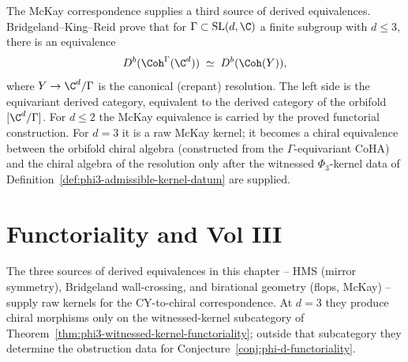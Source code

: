 \begin{remark}
\label{rem:mckay-derived}
The McKay correspondence supplies a third source of derived equivalences. Bridgeland--King--Reid \cite{BridgelandKingReid2001} prove that for $\Gamma \subset \mathrm{SL}(d, \C)$ a finite subgroup with $d \leq 3$, there is an equivalence
\[
 D^b(\Coh^\Gamma(\C^d)) \;\simeq\; D^b(\Coh(Y)),
\]
where $Y \to \C^d/\Gamma$ is the canonical (crepant) resolution. The left side is the equivariant derived category, equivalent to the derived category of the orbifold $[\C^d/\Gamma]$. For $d \leq 2$ the McKay equivalence is carried by the proved functorial construction. For $d = 3$ it is a raw McKay kernel; it becomes a chiral equivalence between the orbifold chiral algebra (constructed from the $\Gamma$-equivariant CoHA) and the chiral algebra of the resolution only after the witnessed $\Phi_3$-kernel data of Definition~\ref{def:phi3-admissible-kernel-datum} are supplied.
\end{remark}

\section{Functoriality and Vol III}
\label{sec:vol3-functoriality}

The three sources of derived equivalences in this chapter -- HMS (mirror symmetry), Bridgeland wall-crossing, and birational geometry (flops, McKay) -- supply raw kernels for the CY-to-chiral correspondence. At $d = 3$ they produce chiral morphisms only on the witnessed-kernel subcategory of Theorem~\ref{thm:phi3-witnessed-kernel-functoriality}; outside that subcategory they determine the obstruction data for Conjecture~\ref{conj:phi-d-functoriality}.

